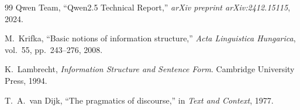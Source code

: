 \documentclass[10pt, letterpaper]{article}
\begin{document}
\begin{thebibliography}{99}
Qwen Team, ``Qwen2.5 Technical Report,'' \textit{arXiv preprint arXiv:2412.15115}, 2024.

M.~Krifka, ``Basic notions of information structure,'' \textit{Acta Linguistica Hungarica}, vol.~55, pp.~243--276, 2008.

K.~Lambrecht, \textit{Information Structure and Sentence Form}. Cambridge University Press, 1994.

T.~A.~van Dijk, ``The pragmatics of discourse,'' in \textit{Text and Context}, 1977.

\end{thebibliography}
\end{document}
